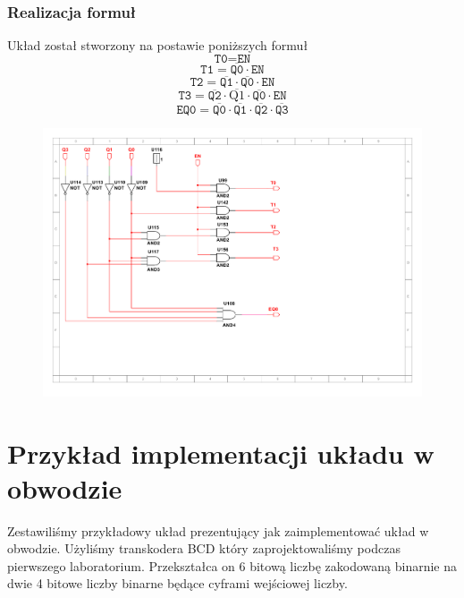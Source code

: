 \documentclass[a4paper]{article}
\begin{document}
\pagebreak
\subsubsection{Realizacja formuł}

Układ został stworzony na postawie poniższych formuł
\[ \texttt{T0} = \texttt{EN}\]
\[ \texttt{T1} = \overline{\texttt{Q0}}\cdot\texttt{EN}\]
\[ \texttt{T2} = \overline{\texttt{Q1}}\cdot\overline{\texttt{Q0}}\cdot\texttt{EN}\]
\[ \texttt{T3} = \overline{\texttt{Q2}}\cdot\overline{\text{Q1}}\cdot\overline{\texttt{Q0}}\cdot\texttt{EN}\]
\[ \texttt{EQ0} = \overline{\texttt{Q0}}\cdot\overline{\texttt{Q1}}\cdot\overline{\texttt{Q2}}\cdot\overline{\texttt{Q3}}\]

\begin{figure}[H]
    \centering
    \includegraphics[width=\textwidth]{timer_driver.pdf}
\end{figure}

\pagebreak
\section{Przykład implementacji układu w obwodzie}
Zestawiliśmy przykładowy układ prezentujący jak zaimplementować układ w obwodzie. Użyliśmy
transkodera BCD który zaprojektowaliśmy podczas pierwszego laboratorium. Przekształca on 
6 bitową liczbę zakodowaną binarnie na dwie 4 bitowe liczby binarne będące cyframi wejściowej liczby.
\end{document}
